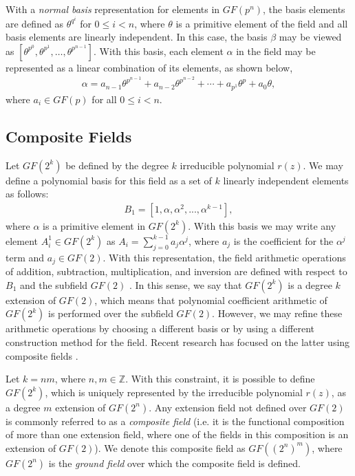 With a \emph{normal basis} representation for elements in $GF(p^n)$, the basis elements are defined as $\theta^{q^{i}}$ for $0 \leq i < n$, where $\theta$ is a primitive element of the field and all basis elements are linearly independent. In this case, the basis $\beta$ may be viewed as $[\theta^{p^{0}},\theta^{p^{1}},\dots,\theta^{p^{n-1}}]$. With this basis, each element $\alpha$ in the field may be represented as a linear combination of its elements, as shown below,
\begin{align*}
\alpha = a_{n-1}\theta^{p^{n-1}} + a_{n-2}\theta^{p^{n-2}} + \dotsb + a_{p^{1}}\theta^{p} + a_0\theta,
\end{align*}
where $a_i \in GF(p)$ for all $0 \leq i < n$.

\subsection{Composite Fields}
Let $GF(2^k)$ be defined by the degree $k$ irreducible polynomial $r(z)$. We may define a polynomial basis for this field as a set of $k$ linearly independent elements as follows:
\begin{align*}
B_1 = [1, \alpha, \alpha^2, ..., \alpha^{k-1}],
\end{align*}
where $\alpha$ is a primitive element in $GF(2^k)$. With this basis we may write any element $A_i^1 \in GF(2^k)$ as $A_i = \sum_{j=0}^{k-1}a_j \alpha^j$, where $a_j$ is the coefficient for the $\alpha^j$ term and $a_j \in GF(2)$. With this representation, the field arithmetic operations of addition, subtraction, multiplication, and inversion are defined with respect to $B_1$ and the subfield $GF(2)$ \cite{Berk03-1}. In this sense, we say that $GF(2^k)$ is a degree $k$ extension of $GF(2)$, which means that polynomial coefficient arithmetic of $GF(2^k)$ is performed over the subfield $GF(2)$. However, we may refine these arithmetic operations by choosing a different basis or by using a different construction method for the field. Recent research has focused on the latter using composite fields \cite{Rudra01-1, Satoh01-1, Mentens05-1, Canright05-1, Boyar11-1}.

Let $k = nm$, where $n, m \in \mathbb{Z}$. With this constraint, it is possible to define $GF(2^k)$, which is uniquely represented by the irreducible polynomial $r(z)$, as a degree $m$ extension of $GF(2^n)$. Any extension field not defined over $GF(2)$ is commonly referred to as a \emph{composite field} (i.e. it is the functional composition of more than one extension field, where one of the fields in this composition is an extension of $GF(2)$). We denote this composite field as $GF((2^n)^m)$, where $GF(2^n)$ is the \emph{ground field} over which the composite field is defined.

